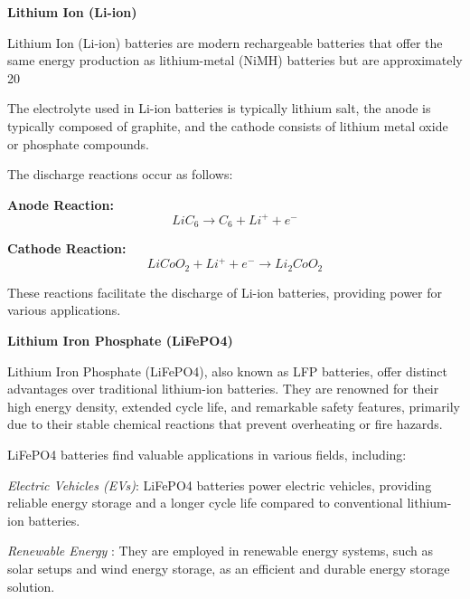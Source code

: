 \documentclass{article}
\begin{document}
\begin{flushleft}
\textbf{Lithium Ion (Li-ion)}

Lithium Ion (Li-ion) batteries are modern rechargeable batteries that offer the same energy production as lithium-metal (NiMH) batteries but are approximately 20%

The electrolyte used in Li-ion batteries is typically lithium salt, the anode is typically composed of graphite, and the cathode consists of lithium metal oxide or phosphate compounds.

The discharge reactions occur as follows:

\textbf{Anode Reaction:}
\begin{equation*}
    LiC_6 \rightarrow C_6 + Li^+ + e^-
\end{equation*}

\textbf{Cathode Reaction:}
\begin{equation*}
    LiCoO_2 + Li^+ + e^- \rightarrow Li_2CoO_2
\end{equation*}

These reactions facilitate the discharge of Li-ion batteries, providing power for various applications.
\newline
\vspace*{3pt}

\textbf{Lithium Iron Phosphate (LiFePO4)}

Lithium Iron Phosphate (LiFePO4), also known as LFP batteries, offer distinct advantages over traditional lithium-ion batteries. They are renowned for their high energy density, extended cycle life, and remarkable safety features, primarily due to their stable chemical reactions that prevent overheating or fire hazards.\newline

LiFePO4 batteries find valuable applications in various fields, including: 

 \textit{Electric Vehicles (EVs)}: LiFePO4 batteries power electric vehicles, providing reliable energy storage and a longer cycle life compared to conventional lithium-ion batteries.
\newline
\vspace*{1.5pt}

\textit{Renewable Energy }: They are employed in renewable energy systems, such as solar setups and wind energy storage, as an efficient and durable energy storage solution.
\vspace*{1.5pt}


\end{flushleft}
\end{document}
